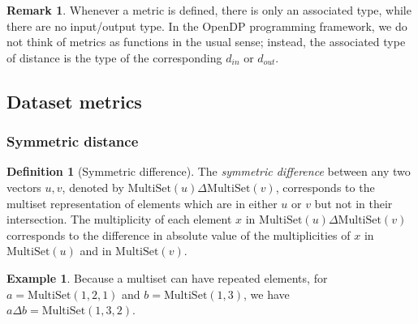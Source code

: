 \documentclass[11pt,a4paper]{article}
\theoremstyle{definition}
\newtheorem{remark}[theorem]{Remark}
\newtheorem{definition}[theorem]{Definition}
\newtheorem{example}[theorem]{Example}
\newcommand{\MultiSet}{\mathrm{MultiSet}}
\newcommand{\din}{d_{in}}
\newcommand{\dout}{d_{out}}
\newcommand{\connor}[1]{{ {\color{teal}{(connor)~#1}}}}
\newcommand{\todo}{{\textcolor{red}{TODO }}}
\begin{document}
\begin{remark}
    Whenever a metric is defined, there is only an associated type, while there are no input/output type. In the OpenDP programming framework, we do not think of metrics as functions in the usual sense; instead, the associated type of distance is the type of the corresponding $\din$ or $\dout$.
\end{remark}

\subsection{Dataset metrics}
\subsubsection{Symmetric distance}

\begin{definition}[Symmetric difference]
The \textit{symmetric difference} between any two vectors $u, v$, denoted by $\MultiSet(u)\Delta \MultiSet(v)$, corresponds to the multiset representation of elements which are in either $u$ or $v$ but not in their intersection. The multiplicity of each element $x$ in $\MultiSet(u)\Delta \MultiSet(v)$ corresponds to the difference in absolute value of the multiplicities of $x$ in $\MultiSet(u)$ and in $\MultiSet(v)$.


\end{definition}



\begin{example}
Because a multiset can have repeated elements, for $a = \MultiSet(1,2,1)$ and $b = \MultiSet(1,3)$, we have $a\Delta b = \MultiSet(1,3, 2)$. 
\end{example}
\end{document}
